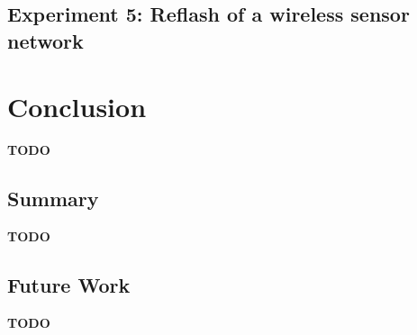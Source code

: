 \section{Experiment 5: Reflash of a wireless sensor network}

\chapter{Conclusion}
\textbf{TODO}
\section{Summary}
\textbf{TODO}
\section{Future Work}
\textbf{TODO}
